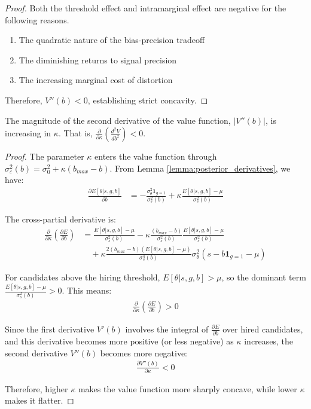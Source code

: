 \begin{proof}
Both the threshold effect and intramarginal effect are negative for the following reasons.
\begin{enumerate}
    \item The quadratic nature of the bias-precision tradeoff
    \item The diminishing returns to signal precision
    \item The increasing marginal cost of distortion
\end{enumerate}

Therefore, $V''(b) < 0$, establishing strict concavity.
\end{proof}


\begin{lemma}
    \label{lemma:flattening}
    The magnitude of the second derivative of the value function, $|V''(b)|$, is increasing in $\kappa$. That is, $\frac{\partial}{\partial \kappa} \left( \frac{d^2V}{db^2} \right) < 0$.
\end{lemma}

\begin{proof}
The parameter $\kappa$ enters the value function through $\sigma_\varepsilon^2(b) = \sigma_0^2 + \kappa(b_{max}-b)$. From Lemma \ref{lemma:posterior_derivatives}, we have:
\begin{align}
\frac{\partial E[\theta | s, g, b]}{\partial b} &= -\frac{\sigma_\theta^2 \mathbf{1}_{g=1}}{\sigma_s^2(b)} + \kappa \frac{E[\theta|s,g,b] - \mu}{\sigma_s^2(b)}
\end{align}

The cross-partial derivative is:
\begin{align}
\frac{\partial}{\partial \kappa} \left( \frac{\partial E}{\partial b} \right) &= \frac{E[\theta|s,g,b] - \mu}{\sigma_s^2(b)} - \kappa \frac{(b_{max}-b)}{\sigma_s^2(b)} \frac{E[\theta|s,g,b] - \mu}{\sigma_s^2(b)} \\
&\quad + \kappa \frac{2(b_{max}-b)(E[\theta|s,g,b] - \mu)}{\sigma_s^4(b)} \sigma_\theta^2 (s - b\mathbf{1}_{g=1} - \mu)
\end{align}

For candidates above the hiring threshold, $E[\theta|s,g,b] > \mu$, so the dominant term $\frac{E[\theta|s,g,b] - \mu}{\sigma_s^2(b)} > 0$. This means:
\begin{align}
\frac{\partial}{\partial \kappa} \left( \frac{\partial E}{\partial b} \right) > 0
\end{align}

Since the first derivative $V'(b)$ involves the integral of $\frac{\partial E}{\partial b}$ over hired candidates, and this derivative becomes more positive (or less negative) as $\kappa$ increases, the second derivative $V''(b)$ becomes more negative:
\begin{align}
\frac{\partial V''(b)}{\partial \kappa} < 0
\end{align}

Therefore, higher $\kappa$ makes the value function more sharply concave, while lower $\kappa$ makes it flatter.
\end{proof}

